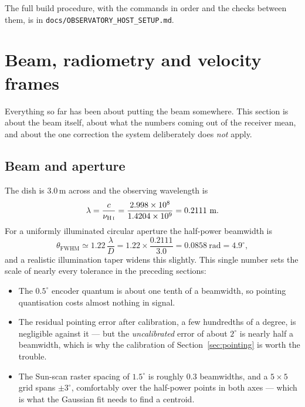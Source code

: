 \documentclass[11pt,a4paper]{article}
\begin{document}
The full build procedure, with the commands in order and the checks between them, is in \texttt{docs/OBSERVATORY\_HOST\_SETUP.md}.

\section{Beam, radiometry and velocity frames}
\label{sec:radiometry}

Everything so far has been about putting the beam somewhere. This section is about the beam itself, about what the numbers coming out of the receiver mean, and about the one correction the system deliberately does \emph{not} apply.

\subsection{Beam and aperture}
\label{sec:beam}

The dish is 3.0\,m across and the observing wavelength is
\begin{equation}
\lambda = \frac{c}{\nu_{\text{H\,\textsc{i}}}} = \frac{2.998\times10^8}{1.4204\times10^9} = 0.2111\ \text{m}.
\end{equation}
For a uniformly illuminated circular aperture the half-power beamwidth is
\begin{equation}
\theta_\text{FWHM} \simeq 1.22\,\frac{\lambda}{D} = 1.22 \times \frac{0.2111}{3.0} = 0.0858\ \text{rad} = 4.9^\circ,
\end{equation}
and a realistic illumination taper widens this slightly. This single number sets the scale of nearly every tolerance in the preceding sections:

\begin{itemize}
    \item The $0.5^\circ$ encoder quantum is about one tenth of a beamwidth, so pointing quantisation costs almost nothing in signal.
    \item The residual pointing error after calibration, a few hundredths of a degree, is negligible against it --- but the \emph{uncalibrated} error of about $2^\circ$ is nearly half a beamwidth, which is why the calibration of Section~\ref{sec:pointing} is worth the trouble.
    \item The Sun-scan raster spacing of $1.5^\circ$ is roughly $0.3$ beamwidths, and a $5\times5$ grid spans $\pm3^\circ$, comfortably over the half-power points in both axes --- which is what the Gaussian fit needs to find a centroid.
\end{itemize}
\end{document}

